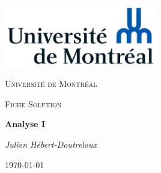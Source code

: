 \documentclass{article}[babel]
\begin{document}
	\begin{titlepage}
		\centering
		\includegraphics[width=0.5\textwidth]{Universite_de_Montreal_logo}\par\vspace{1cm}
		{\scshape\LARGE Université de Montréal\par}
		\vspace{1cm}
		{\scshape\Large Fiche Solution\par}
		\vspace{1.5cm}
		{\huge\bfseries Analyse I\par}
		\vspace{2cm}
		{\Large\itshape Julien Hébert-Doutreloux\par}
		\vfill
		\vfill
		{\large \today\par}
	\end{titlepage}
		\setcounter{page}{2}
	
		\newpage
		\printindex
\end{document}
